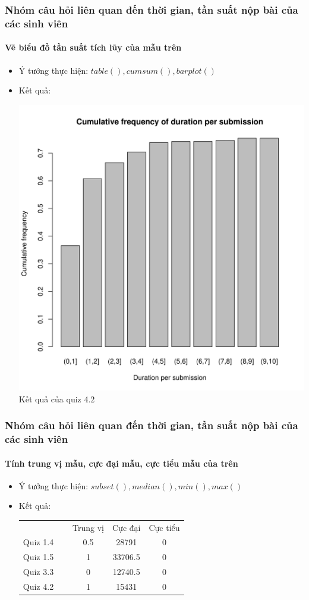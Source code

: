 \documentclass[english,10pt,table]{beamer}
\begin{document}
\frame
{
\frametitle{Nhóm câu hỏi liên quan đến thời gian, tần suất nộp bài của các sinh viên}
\framesubtitle{Vẽ biểu đồ tần suất tích lũy của mẫu trên}
\begin{itemize}
    \item Ý tưởng thực hiện: $table(), cumsum(), barplot()$
    \item Kết quả:\\
    \begin{center}
        \includegraphics[width = 6 cm]{Images/img4-6-4.png}\\
        Kết quả của quiz 4.2
    \end{center}
\end{itemize}
}

\frame
{
\frametitle{Nhóm câu hỏi liên quan đến thời gian, tần suất nộp bài của các sinh viên}
\framesubtitle{Tính trung vị mẫu, cực đại mẫu, cực tiểu mẫu của trên}
\begin{itemize}
    \item Ý tưởng thực hiện: $subset(), median(), min(), max()$
    \item Kết quả:\\
    \begin{center}
        \begin{tabular}{l l c c c}
             & & Trung vị & Cực đại & Cực tiểu\\
             Quiz 1.4 & $\;$ & 0.5 & 28791 & 0\\
             Quiz 1.5 & $\;$ & 1 & 33706.5 & 0\\
             Quiz 3.3 & $\;$ & 0 & 12740.5 & 0\\
             Quiz 4.2 & $\;$ & 1 & 15431 & 0
        \end{tabular}
    \end{center}
\end{itemize}
}
\end{document}
